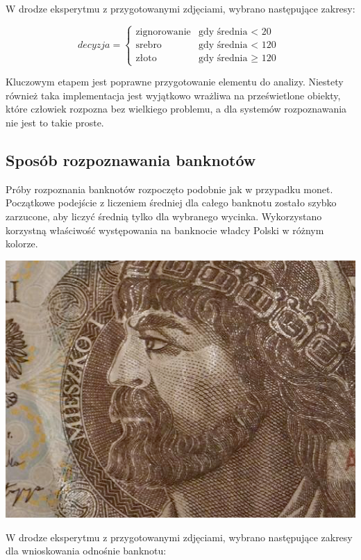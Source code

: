 \documentclass{mwart}
\begin{document}
W drodze eksperytmu z przygotowanymi zdjęciami, wybrano następujące zakresy:

$$
decyzja = \left\{\begin{array}{ll}
\textrm{zignorowanie} & \textrm{gdy średnia $<$ 20}\\
\textrm{srebro} & \textrm{gdy średnia $<$ 120}\\
\textrm{złoto} & \textrm{gdy średnia $\geq$ 120 }
\end{array} \right.
$$

Kluczowym etapem jest poprawne przygotowanie elementu do analizy. Niestety również taka implementacja jest wyjątkowo wrażliwa na prześwietlone obiekty, które człowiek rozpozna bez wielkiego problemu, a dla systemów rozpoznawania nie jest to takie proste.

\subsection{Sposób rozpoznawania banknotów}

Próby rozpoznania banknotów rozpoczęto podobnie jak w przypadku monet. Początkowe podejście z liczeniem średniej dla całego banknotu zostało szybko zarzucone, aby liczyć średnią tylko dla wybranego wycinka. Wykorzystano korzystną właściwość występowania na banknocie władcy Polski w różnym kolorze.

\begin{center}
    \includegraphics[width=\textwidth]{10_PLN_part.png}
\end{center}

W drodze eksperytmu z przygotowanymi zdjęciami, wybrano następujące zakresy dla wnioskowania odnośnie banknotu:
\end{document}
